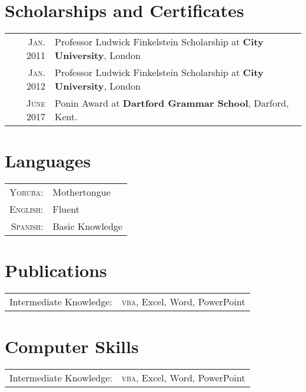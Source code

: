 \documentclass[letterpaper,11pt]{article}
\begin{document}
\section{Scholarships and Certificates}
\begin{tabular}{rl}
 \textsc{Jan.} 2011 & Professor Ludwick Finkelstein Scholarship at \textbf{City University}, London\\
\textsc{Jan.} 2012 & Professor Ludwick Finkelstein Scholarship at \textbf{City University}, London\\
\textsc{June} 2017 & Ponin Award at \textbf{Dartford Grammar School}, Darford, Kent.
\end{tabular}


\section{Languages}
\begin{tabular}{rl}
 \textsc{Yoruba:}&Mothertongue\\
\textsc{English:}&Fluent\\
\textsc{Spanish:}&Basic Knowledge\\
\end{tabular}

\section{Publications}
\begin{tabular}{rl}
Intermediate Knowledge:& \textsc{vba}, Excel, Word, PowerPoint\\
\end{tabular}


\section{Computer Skills}
\begin{tabular}{rl}
Intermediate Knowledge:& \textsc{vba}, Excel, Word, PowerPoint\\
\end{tabular}
\end{document}
